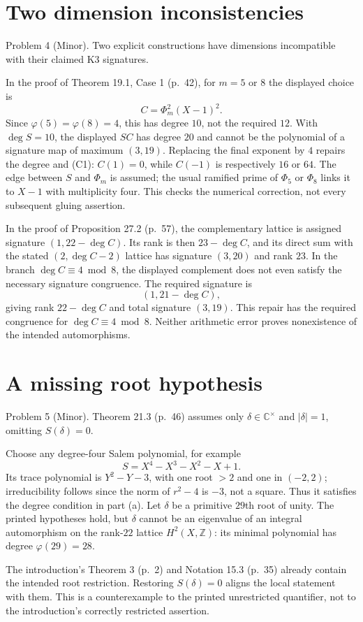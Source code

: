 \documentclass[10pt]{article}
\begin{document}
\section*{Two dimension inconsistencies}
Problem 4 (Minor).  Two explicit constructions have dimensions incompatible with their claimed K3 signatures.\par
In the proof of Theorem 19.1, Case 1 (p. 42), for \(m=5\) or \(8\) the displayed choice is \[C=\Phi_m^2(X-1)^2.\] Since \(\varphi(5)=\varphi(8)=4\), this has degree \(10\), not the required \(12\). With \(\deg S=10\), the displayed \(SC\) has degree \(20\) and cannot be the polynomial of a signature map of maximum \((3,19)\). Replacing the final exponent by \(4\) repairs the degree and (C1): \(C(1)=0\), while \(C(-1)\) is respectively \(16\) or \(64\). The edge between \(S\) and \(\Phi_m\) is assumed; the usual ramified prime of \(\Phi_5\) or \(\Phi_8\) links it to \(X-1\) with multiplicity four. This checks the numerical correction, not every subsequent gluing assertion.\par
In the proof of Proposition 27.2 (p. 57), the complementary lattice is assigned signature \((1,22-\deg C)\). Its rank is then \(23-\deg C\), and its direct sum with the stated \((2,\deg C-2)\) lattice has signature \((3,20)\) and rank \(23\). In the branch \(\deg C\equiv4\bmod8\), the displayed complement does not even satisfy the necessary signature congruence. The required signature is \[(1,21-\deg C),\] giving rank \(22-\deg C\) and total signature \((3,19)\). This repair has the required congruence for \(\deg C\equiv4\bmod8\). Neither arithmetic error proves nonexistence of the intended automorphisms.\par
\section*{A missing root hypothesis}
Problem 5 (Minor).  Theorem 21.3 (p. 46) assumes only \(\delta\in\mathbb C^\times\) and \(|\delta|=1\), omitting \(S(\delta)=0\).\par
Choose any degree-four Salem polynomial, for example \[S=X^4-X^3-X^2-X+1.\] Its trace polynomial is \(Y^2-Y-3\), with one root \(>2\) and one in \((-2,2)\); irreducibility follows since the norm of \(r^2-4\) is \(-3\), not a square. Thus it satisfies the degree condition in part (a). Let \(\delta\) be a primitive \(29\)th root of unity. The printed hypotheses hold, but \(\delta\) cannot be an eigenvalue of an integral automorphism on the rank-\(22\) lattice \(H^2(X,\mathbb Z)\): its minimal polynomial has degree \(\varphi(29)=28\).\par
The introduction’s Theorem 3 (p. 2) and Notation 15.3 (p. 35) already contain the intended root restriction. Restoring \(S(\delta)=0\) aligns the local statement with them. This is a counterexample to the printed unrestricted quantifier, not to the introduction’s correctly restricted assertion.\par
\end{document}
